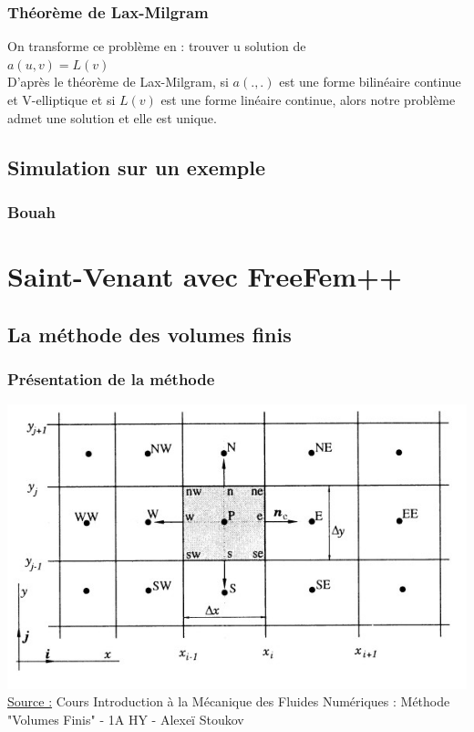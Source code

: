 \documentclass[handout]{beamer}
\begin{document}
\begin{frame}
	\frametitle{Théorème de Lax-Milgram}
	On transforme ce problème en : trouver u solution de \\
	$a\left(u, v\right)=L\left(v\right)$\\
	D'après le théorème de Lax-Milgram, si $a\left(.,.\right)$ est une forme bilinéaire continue et V-elliptique et si $L\left(v\right)$ est une forme linéaire continue, alors notre problème admet une solution et elle est unique.
\end{frame}

\subsection[Simulation]{Simulation sur un exemple}
\begin{frame}
	\frametitle{Bouah}

\end{frame}

\section[FreeFem++]{Saint-Venant avec FreeFem++}
\subsection[Volumes finis]{La méthode des volumes finis}
\begin{frame}
	\frametitle{Présentation de la méthode}
	\centering \includegraphics[scale=0.62]{3.jpg}\\
	\tiny{\underline{Source :} Cours Introduction à la Mécanique des Fluides Numériques : Méthode "Volumes Finis" - 1A HY - Alexeï Stoukov}
\end{frame}
\end{document}
